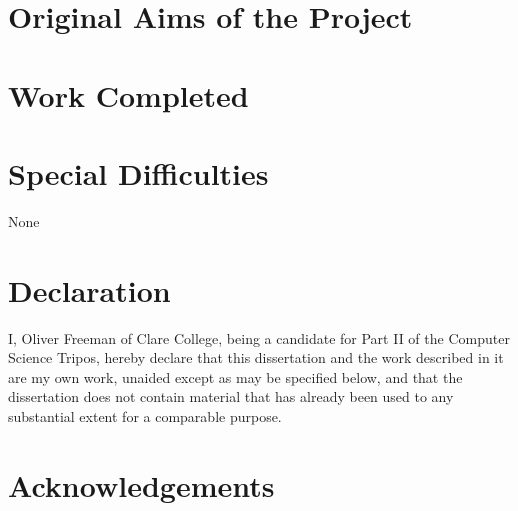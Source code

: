 \documentclass[12pt,notitlepage]{report}
\begin{document}
\section*{Original Aims of the Project}


\section*{Work Completed}


\section*{Special Difficulties}

None
 
\newpage
\section*{Declaration}

I, Oliver Freeman of Clare College, being a candidate for Part II of the Computer
Science Tripos, hereby declare that this dissertation and the work described in it are my own work,
unaided except as may be specified below, and that the dissertation
does not contain material that has already been used to any substantial
extent for a comparable purpose.

\bigskip
{}

\medskip
{}

\cleardoublepage

\tableofcontents

\listoffigures

\listofalgorithms

\newpage
\section*{Acknowledgements}



\cleardoublepage        %

\setcounter{page}{1}
\pagestyle{headings}
\end{document}
